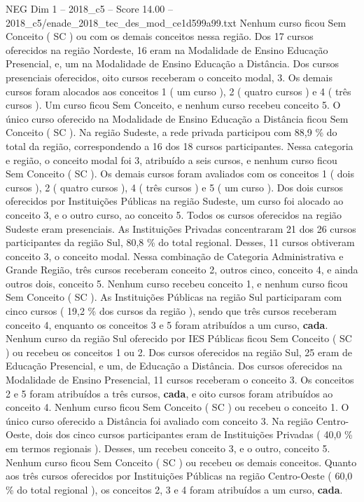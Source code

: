 \begin{textsample}{NEG Dim 1 – 2018\_c5 – Score 14.00 – 2018\_c5/enade\_2018\_tec\_des\_mod\_ce1d599a99.txt}
Nenhum curso ficou Sem Conceito ( SC ) ou com os demais conceitos nessa região.
Dos 17 cursos oferecidos na região Nordeste, 16 eram na Modalidade de Ensino Educação Presencial, e, um na Modalidade de Ensino Educação a Distância.
Dos cursos presenciais oferecidos, oito cursos receberam o conceito modal, 3.
Os demais cursos foram alocados aos conceitos 1 ( um curso ), 2 ( quatro cursos ) e 4 ( três cursos ).
Um curso ficou Sem Conceito, e nenhum curso recebeu conceito 5.
O único curso oferecido na Modalidade de Ensino Educação a Distância ficou Sem Conceito ( SC ).
Na região Sudeste, a rede privada participou com 88,9 \% do total da região, correspondendo a 16 dos 18 cursos participantes.
Nessa categoria e região, o conceito modal foi 3, atribuído a seis cursos, e nenhum curso ficou Sem Conceito ( SC ).
Os demais cursos foram avaliados com os conceitos 1 ( dois cursos ), 2 ( quatro cursos ), 4 ( três cursos ) e 5 ( um curso ).
Dos dois cursos oferecidos por Instituições Públicas na região Sudeste, um curso foi alocado ao conceito 3, e o outro curso, ao conceito 5.
Todos os cursos oferecidos na região Sudeste eram presenciais.
As Instituições Privadas concentraram 21 dos 26 cursos participantes da região Sul, 80,8 \% do total regional.
Desses, 11 cursos obtiveram conceito 3, o conceito modal.
Nessa combinação de Categoria Administrativa e Grande Região, três cursos receberam conceito 2, outros cinco, conceito 4, e ainda outros dois, conceito 5.
Nenhum curso recebeu conceito 1, e nenhum curso ficou Sem Conceito ( SC ).
As Instituições Públicas na região Sul participaram com cinco cursos ( 19,2 \% dos cursos da região ), sendo que três cursos receberam conceito 4, enquanto os conceitos 3 e 5 foram atribuídos a um curso, \textbf{cada}.
Nenhum curso da região Sul oferecido por IES Públicas ficou Sem Conceito ( SC ) ou recebeu os conceitos 1 ou 2.
Dos cursos oferecidos na região Sul, 25 eram de Educação Presencial, e um, de Educação a Distância.
Dos cursos oferecidos na Modalidade de Ensino Presencial, 11 cursos receberam o conceito 3.
Os conceitos 2 e 5 foram atribuídos a três cursos, \textbf{cada}, e oito cursos foram atribuídos ao conceito 4.
Nenhum curso ficou Sem Conceito ( SC ) ou recebeu o conceito 1.
O único curso oferecido a Distância foi avaliado com conceito 3.
Na região Centro-Oeste, dois dos cinco cursos participantes eram de Instituições Privadas ( 40,0 \% em termos regionais ).
Desses, um recebeu conceito 3, e o outro, conceito 5.
Nenhum curso ficou Sem Conceito ( SC ) ou recebeu os demais conceitos.
Quanto aos três cursos oferecidos por Instituições Públicas na região Centro-Oeste ( 60,0 \% do total regional ), os conceitos 2, 3 e 4 foram atribuídos a um curso, \textbf{cada}.

\end{textsample}
